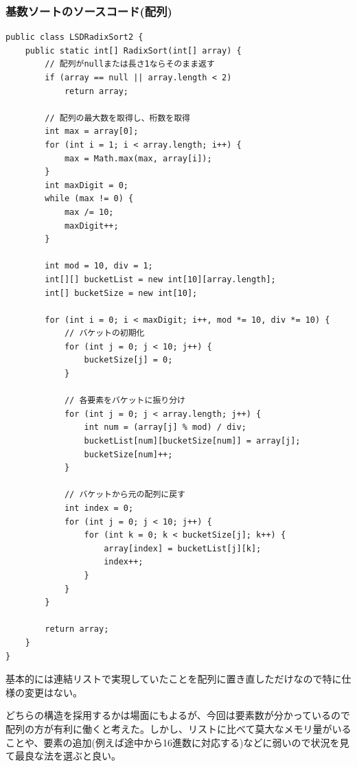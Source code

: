 \documentclass[a4j,dvipdfmx]{jsreport}
\begin{document}
\subsubsection{基数ソートのソースコード(配列)}
\lstset{caption=LSDRadixSort,firstnumber=1}
\begin{lstlisting}[style=source]
public class LSDRadixSort2 {
    public static int[] RadixSort(int[] array) {
        // 配列がnullまたは長さ1ならそのまま返す
        if (array == null || array.length < 2)
            return array;
        
        // 配列の最大数を取得し、桁数を取得
        int max = array[0];
        for (int i = 1; i < array.length; i++) {
            max = Math.max(max, array[i]);
        }
        int maxDigit = 0;
        while (max != 0) {
            max /= 10;
            maxDigit++;
        }
        
        int mod = 10, div = 1;
        int[][] bucketList = new int[10][array.length];
        int[] bucketSize = new int[10];
        
        for (int i = 0; i < maxDigit; i++, mod *= 10, div *= 10) {
            // バケットの初期化
            for (int j = 0; j < 10; j++) {
                bucketSize[j] = 0;
            }
            
            // 各要素をバケットに振り分け
            for (int j = 0; j < array.length; j++) {
                int num = (array[j] % mod) / div;
                bucketList[num][bucketSize[num]] = array[j];
                bucketSize[num]++;
            }
            
            // バケットから元の配列に戻す
            int index = 0;
            for (int j = 0; j < 10; j++) {
                for (int k = 0; k < bucketSize[j]; k++) {
                    array[index] = bucketList[j][k];
                    index++;
                }
            }
        }
        
        return array;
    }
}
\end{lstlisting}

基本的には連結リストで実現していたことを配列に置き直しただけなので特に仕様の変更はない。\par
どちらの構造を採用するかは場面にもよるが、今回は要素数が分かっているので配列の方が有利に働くと考えた。しかし、リストに比べて莫大なメモリ量がいることや、要素の追加(例えば途中から16進数に対応する)などに弱いので状況を見て最良な法を選ぶと良い。
\end{document}
